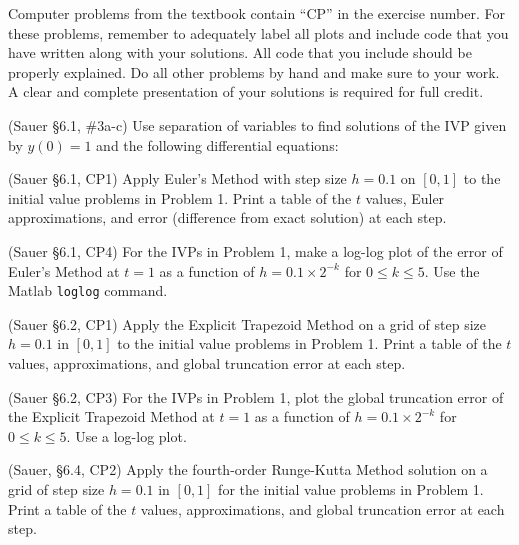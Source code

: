 \documentclass[12pt,fleqn]{exam}
\begin{document}
Computer problems from the textbook contain ``CP'' in the exercise number. For these problems, remember to adequately label all plots and include code that you have written along with your solutions. All code that you include should be properly explained. Do all other problems by hand and make sure to your work. A clear and complete presentation of your solutions is required for full credit.

\begin{questions}

\question (Sauer \S6.1, \#3a-c) Use separation of variables to find solutions of the IVP given by $y(0) = 1$ and the following differential equations:


\question (Sauer \S6.1, CP1) Apply Euler's Method with step size $h = 0.1$ on $[0,1]$ to the initial value problems in
Problem 1. Print a table of the $t$ values, Euler approximations, and error (difference from exact solution) at each step.

\question (Sauer \S6.1, CP4) For the IVPs in Problem 1, make a log-log plot of the error of Euler's Method at $t = 1$ as a function of $h = 0.1 \times 2^{-k}$ for $0 \leq k \leq 5$. Use the Matlab \verb$loglog$ command.

\question (Sauer \S6.2, CP1) Apply the Explicit Trapezoid Method on a grid of step size $h = 0.1$ in $[0,1]$ to the initial value problems in Problem 1. Print a table of the $t$ values, approximations, and global truncation error at each step.

\question (Sauer \S6.2, CP3) For the IVPs in Problem 1, plot the global truncation error of the Explicit Trapezoid Method at $t = 1$ as a function of $h = 0.1 \times 2^{-k}$ for $0 \leq k \leq 5$. Use a log-log plot.

\question (Sauer, \S6.4, CP2) Apply the fourth-order Runge-Kutta Method solution on a grid of step size $h = 0.1$ in $[0,1]$ for the initial value problems in Problem 1. Print a table of the $t$ values, approximations, and global truncation error at each step.


\end{questions}
\end{document}
